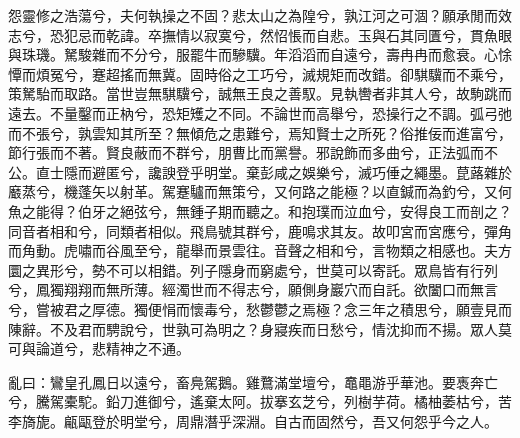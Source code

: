 
\begin{pinyinscope}
怨靈修之浩蕩兮，夫何執操之不固？悲太山之為隍兮，孰江河之可涸？願承閒而效志兮，恐犯忌而乾諱。卒撫情以寂寞兮，然怊悵而自悲。玉與石其同匱兮，貫魚眼與珠璣。駑駿雜而不分兮，服罷牛而驂驥。年滔滔而自遠兮，壽冉冉而愈衰。心悇憛而煩冤兮，蹇超搖而無冀。固時俗之工巧兮，滅規矩而改錯。卻騏驥而不乘兮，策駑駘而取路。當世豈無騏驥兮，誠無王良之善馭。見執轡者非其人兮，故駒跳而遠去。不量鑿而正枘兮，恐矩矱之不同。不論世而高舉兮，恐操行之不調。弧弓弛而不張兮，孰雲知其所至？無傾危之患難兮，焉知賢士之所死？俗推佞而進富兮，節行張而不著。賢良蔽而不群兮，朋曹比而黨譽。邪說飾而多曲兮，正法弧而不公。直士隱而避匿兮，讒諛登乎明堂。棄彭咸之娛樂兮，滅巧倕之繩墨。菎蕗雜於黀蒸兮，機蓬矢以射革。駕蹇驢而無策兮，又何路之能極？以直鍼而為釣兮，又何魚之能得？伯牙之絕弦兮，無鍾子期而聽之。和抱璞而泣血兮，安得良工而剖之？同音者相和兮，同類者相似。飛鳥號其群兮，鹿鳴求其友。故叩宮而宮應兮，彈角而角動。虎嘯而谷風至兮，龍舉而景雲往。音聲之相和兮，言物類之相感也。夫方圜之異形兮，勢不可以相錯。列子隱身而窮處兮，世莫可以寄託。眾鳥皆有行列兮，鳳獨翔翔而無所薄。經濁世而不得志兮，願側身巖穴而自託。欲闔口而無言兮，嘗被君之厚德。獨便悁而懷毒兮，愁鬱鬱之焉極？念三年之積思兮，願壹見而陳辭。不及君而騁說兮，世孰可為明之？身寢疾而日愁兮，情沈抑而不揚。眾人莫可與論道兮，悲精神之不通。

亂曰：鸞皇孔鳳日以遠兮，畜鳧駕鵝。雞鶩滿堂壇兮，鼁黽游乎華池。要褭奔亡兮，騰駕橐駝。鉛刀進御兮，遙棄太阿。拔搴玄芝兮，列樹芋荷。橘柚萎枯兮，苦李旖旎。甂甌登於明堂兮，周鼎潛乎深淵。自古而固然兮，吾又何怨乎今之人。


\end{pinyinscope}